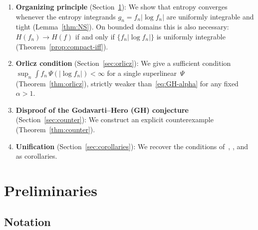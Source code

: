 \documentclass[journal]{IEEEtran}
\theoremstyle{definition}
\theoremstyle{remark}
\newcommand{\1}{\mathbf{1}}
\newcommand{\Hent}{H}
\newcommand{\abs}[1]{\lvert #1 \rvert}
\begin{document}
\begin{enumerate}
\item \textbf{Organizing principle}
  (Section~\ref{sec:prelim}):
  We show that entropy converges whenever the entropy integrands
  $g_n = f_n\abs{\log f_n}$ are uniformly integrable and tight
  (Lemma~\ref{thm:NS}).  On bounded domains this is also
  necessary: $\Hent(f_n) \to \Hent(f)$ if and only if
  $\{f_n\abs{\log f_n}\}$ is uniformly integrable
  (Theorem~\ref{prop:compact-iff}).

\item \textbf{Orlicz condition}
  (Section~\ref{sec:orlicz}):
  We give a sufficient condition
  $\sup_n \int f_n\, \Psi(\abs{\log f_n}) < \infty$ for a single
  superlinear~$\Psi$ (Theorem~\ref{thm:orlicz}), strictly weaker
  than~\eqref{eq:GH-alpha} for any fixed $\alpha > 1$.

\item \textbf{Disproof of the Godavarti--Hero (GH) conjecture}
  (Section~\ref{sec:counter}):
  We construct an explicit counterexample (Theorem~\ref{thm:counter}).

\item \textbf{Unification}
  (Section~\ref{sec:corollaries}):
  We recover the conditions of~\cite{GodavartiHero2004},
  \cite{PieraParada2009},
  and~\cite{GhourchianGohariAmini2017} as corollaries.
\end{enumerate}

\section{Preliminaries}\label{sec:prelim}

\subsection{Notation}
\end{document}
